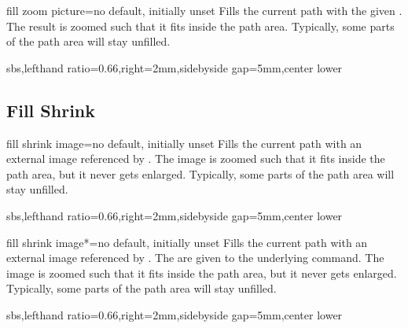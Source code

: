 \documentclass[a4paper,11pt]{article}
\begin{document}
\begin{myvoid}
\begin{docTikzKey}{fill zoom picture}{=}{no default, initially unset}
  Fills the current path with the given .
  The result is zoomed such that it fits inside the path area.
  Typically, some parts of the path area will stay unfilled.
\begin{dispExample*}{sbs,lefthand ratio=0.66,right=2mm,sidebyside gap=5mm,center lower}
\end{dispExample*}
\end{docTikzKey}


\clearpage
\subsection{Fill Shrink}
\begin{docTikzKey}{fill shrink image}{=}{no default, initially unset}
  Fills the current path with an external image referenced by .
  The image is zoomed such that it fits inside the path area, but it never
  gets enlarged.
  Typically, some parts of the path area will stay unfilled.
\begin{dispExample*}{sbs,lefthand ratio=0.66,right=2mm,sidebyside gap=5mm,center lower}
\end{dispExample*}
\end{docTikzKey}


\begin{docTikzKey}{fill shrink image*}{=}{no default, initially unset}
  Fills the current path with an external image referenced by .
  The  are given to the underlying  command.
  The image is zoomed such that it fits inside the path area, but it never
  gets enlarged.
  Typically, some parts of the path area will stay unfilled.
\begin{dispExample*}{sbs,lefthand ratio=0.66,right=2mm,sidebyside gap=5mm,center lower}
\end{dispExample*}
\end{docTikzKey}



\end{myvoid}
\end{document}
